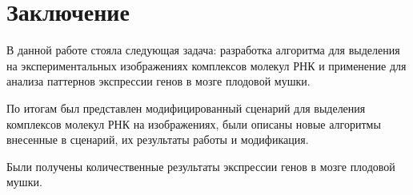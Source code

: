 \chapter{Заключение} \label{ch5}

В данной работе стояла следующая задача: разработка алгоритма для выделения на экспериментальных изображениях комплексов молекул РНК и применение для анализа паттернов экспрессии генов в мозге плодовой мушки.

По итогам был представлен модифицированный сценарий для выделения комплексов молекул РНК на  изображениях, были описаны новые алгоритмы внесенные в сценарий, их результаты работы и модификация.

Были получены количественные результаты экспрессии генов в мозге плодовой мушки.






%
